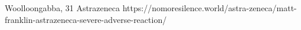           {Woolloongabba, }
          {31}
          {Astrazeneca}
          {}
          {
          }
          {https://nomoresilence.world/astra-zeneca/matt-franklin-astrazeneca-severe-adverse-reaction/}


